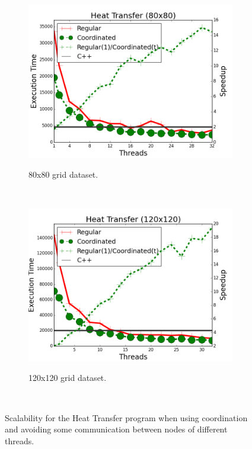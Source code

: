 \begin{figure}[]
        \centering
        \begin{subfigure}[b]{\plotsize\textwidth}
           \includegraphics[width=\textwidth]{experiments/coordination/cmpnew-new-heat-transfer-80.png}
           \label{fig:coordination:coord_ht_80}
           \caption{80x80 grid dataset.}
        \end{subfigure}
        ~
        \begin{subfigure}[b]{\plotsize\textwidth}
           \includegraphics[width=\textwidth]{experiments/coordination/cmpnew-new-heat-transfer-120.png}
           \label{fig:coordination:coord_ht_120}
           \caption{120x120 grid dataset.}
        \end{subfigure} \\
        \caption{Scalability for the Heat Transfer program when using
        coordination and avoiding some communication between nodes of different
        threads.}
        \label{fig:coordination:results_ht_new}
\end{figure}
